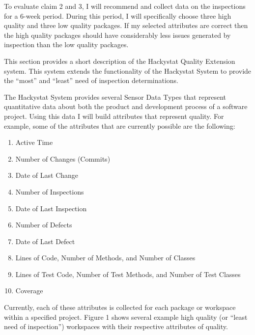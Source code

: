 \documentclass[11pt,twocolumn]{article}
\begin{document}
To evaluate claim 2 and 3, I will recommend and collect data on the
inspections for a 6-week period. During this period, I will specifically
choose three high quality and three low quality packages. If my selected
attributes are correct then the high quality packages should have
considerably less issues generated by inspection than the low quality
packages.

This section provides a short description of the Hackystat Quality
Extension system. This system extends the functionality of the Hackystat
System to provide the ``most'' and ``least'' need of inspection determinations.

The Hackystat System provides several Sensor Data Types that represent
quantitative data about both the product and development process of a
software project. Using this data I will build attributes that represent
quality. For example, some of the attributes that are currently possible
are the following:

\begin{enumerate}
\item Active Time
\item Number of Changes (Commits)
\item Date of Last Change
\item Number of Inspections
\item Date of Last Inspection
\item Number of Defects
\item Date of Last Defect
\item Lines of Code, Number of Methods, and Number of Classes
\item Lines of Test Code, Number of Test Methods, and Number of Test
Classes
\item Coverage
\end{enumerate}

Currently, each of these attributes is collected for each package or
workspace within a specified project. Figure 1 shows several example high
quality (or ``least need of inspection'') workspaces with their respective
attributes of quality.
\end{document}
